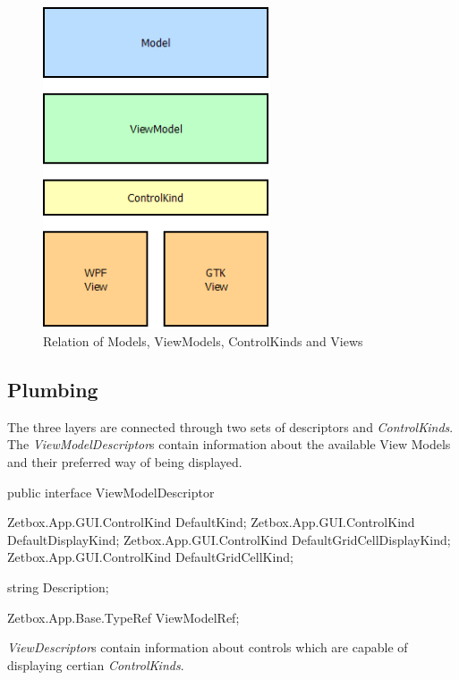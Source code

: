 \begin{figure}[ht]
	\begin{center}
		\includegraphics[width=0.6\textwidth]{images/GUI_Relation_MVVM.png}
		\caption{Relation of Models, ViewModels, ControlKinds and Views}
		\label{GUI_Relation_MVVM}
	\end{center}
\end{figure}

\subsection{Plumbing}

The three layers are connected through two sets of descriptors and \emph{ControlKinds}. The
\emph{ViewModelDescriptor}s contain information about the
available View Models and their preferred way of being displayed. 

\begin{CS}
public interface ViewModelDescriptor
{
	Zetbox.App.GUI.ControlKind DefaultKind;
	Zetbox.App.GUI.ControlKind DefaultDisplayKind;
	Zetbox.App.GUI.ControlKind DefaultGridCellDisplayKind;
	Zetbox.App.GUI.ControlKind DefaultGridCellKind;
	
	string Description;
	
	Zetbox.App.Base.TypeRef ViewModelRef;
}
\end{CS}

\emph{ViewDescriptor}s contain information about controls which are capable of displaying certian \emph{ControlKinds}.

